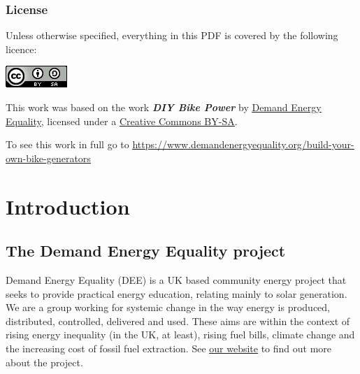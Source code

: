 \documentclass{article}
\theoremstyle{definition}
\theoremstyle{definition}
\theoremstyle{remark}
\begin{document}
  \subsubsection*{License} %
  \label{ssub:license}

    Unless otherwise specified, everything in this PDF is covered by the following licence:

    \includegraphics[]{../Images/image_0_2_(license).png} \newline

    This work was based on the work \textbf{\textit{DIY Bike Power}} by \href{https://www.demandenergyequality.org/}{\underline{Demand Energy Equality}}, licensed under a \href{https://creativecommons.org/licenses/by-sa/4.0/legalcode}{\underline{Creative Commons BY-SA}}.

    To see this work in full go to \href{https://www.demandenergyequality.org/build-your-own-bike-generators}{\underline{https://www.demandenergyequality.org/build-your-own-bike-generators}}
  


\newpage

\section{Introduction} %
\label{sec:introduction}

  \subsection{The Demand Energy Equality project} %
  \label{sub:the_demand_energy_equality_project}

    Demand Energy Equality (DEE) is a UK based community energy project that seeks to provide practical energy education, relating mainly to solar generation. We are a group working for systemic change in the way energy is produced, distributed, controlled, delivered and used. These aims are within the context of rising energy inequality (in the UK, at least), rising fuel bills, climate change and the increasing cost of fossil fuel extraction. See \href{https://www.demandenergyequality.org/about/}{\underline{our website}} to find out more about the project.
\end{document}
